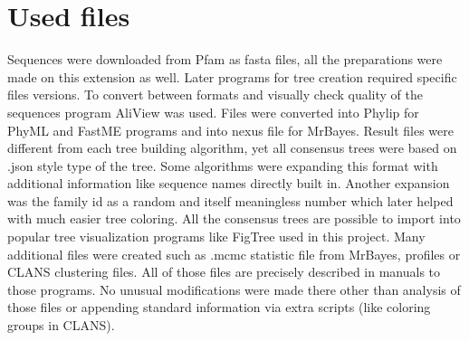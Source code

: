 \section{Used files}
Sequences were downloaded from Pfam as fasta files, all the preparations were made on this extension as well.
Later programs for tree creation required specific files versions.
To convert between formats and visually check quality of the sequences program AliView was used.
Files were converted into Phylip for PhyML and FastME programs and into nexus file for MrBayes.
Result files were different from each tree building algorithm, yet all consensus trees were based on .json style type of the tree.
Some algorithms were expanding this format with additional information like sequence names directly built in.
Another expansion was the family id as a random and itself meaningless number which later helped with much easier tree coloring.
All the consensus trees are possible to import into popular tree visualization programs like FigTree used in this project.
Many additional files were created such as .mcmc statistic file from MrBayes, profiles or CLANS clustering files.
All of those files are precisely described in manuals to those programs.
No unusual modifications were made there other than analysis of those files or appending standard information via extra scripts (like coloring groups in CLANS).


